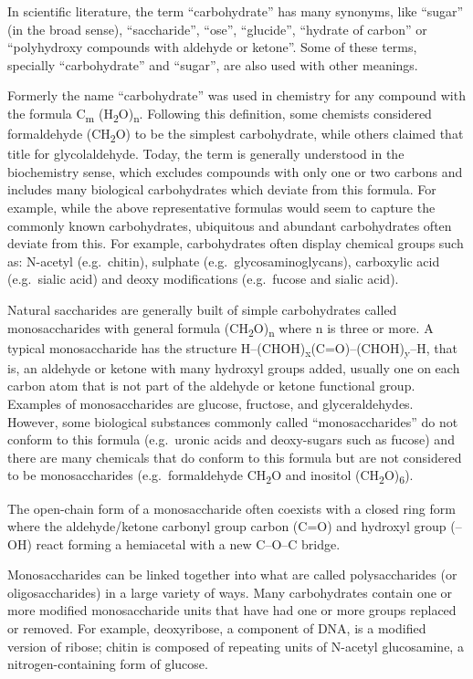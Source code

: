 In scientific literature, the term ``carbohydrate'' has many synonyms,
like ``sugar'' (in the broad sense), ``saccharide'', ``ose'',
``glucide'', ``hydrate of carbon'' or ``polyhydroxy compounds with
aldehyde or ketone''. Some of these terms, specially ``carbohydrate''
and ``sugar'', are also used with other meanings.

Formerly the name ``carbohydrate'' was used in chemistry for any
compound with the formula C\textsubscript{m}
(H\textsubscript{2}O)\textsubscript{n}. Following this definition, some
chemists considered formaldehyde (CH\textsubscript{2}O) to be the
simplest carbohydrate, while others claimed that title for
glycolaldehyde. Today, the term is generally understood in the
biochemistry sense, which excludes compounds with only one or two
carbons and includes many biological carbohydrates which deviate from
this formula. For example, while the above representative formulas would
seem to capture the commonly known carbohydrates, ubiquitous and
abundant carbohydrates often deviate from this. For example,
carbohydrates often display chemical groups such as: N-acetyl
(e.g.~chitin), sulphate (e.g.~glycosaminoglycans), carboxylic acid
(e.g.~sialic acid) and deoxy modifications (e.g.~fucose and sialic
acid).

Natural saccharides are generally built of simple carbohydrates called
monosaccharides with general formula
(CH\textsubscript{2}O)\textsubscript{n} where n is three or more. A
typical monosaccharide has the structure
H--(CHOH)\textsubscript{x}(C=O)--(CHOH)\textsubscript{y}--H, that is, an
aldehyde or ketone with many hydroxyl groups added, usually one on each
carbon atom that is not part of the aldehyde or ketone functional group.
Examples of monosaccharides are glucose, fructose, and glyceraldehydes.
However, some biological substances commonly called ``monosaccharides''
do not conform to this formula (e.g.~uronic acids and deoxy-sugars such
as fucose) and there are many chemicals that do conform to this formula
but are not considered to be monosaccharides (e.g.~formaldehyde
CH\textsubscript{2}O and inositol
(CH\textsubscript{2}O)\textsubscript{6}).

The open-chain form of a monosaccharide often coexists with a closed
ring form where the aldehyde/ketone carbonyl group carbon (C=O) and
hydroxyl group (--OH) react forming a hemiacetal with a new C--O--C
bridge.

Monosaccharides can be linked together into what are called
polysaccharides (or oligosaccharides) in a large variety of ways. Many
carbohydrates contain one or more modified monosaccharide units that
have had one or more groups replaced or removed. For example,
deoxyribose, a component of DNA, is a modified version of ribose; chitin
is composed of repeating units of N-acetyl glucosamine, a
nitrogen-containing form of glucose.

